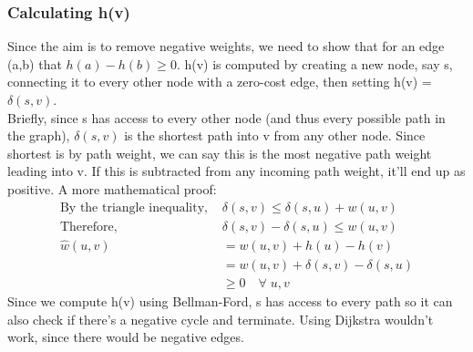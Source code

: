 \subsubsection{Calculating h(v)}
Since the aim is to remove negative weights, we need to show that for an edge (a,b) that \(h(a)-h(b) \geq 0\). h(v) is computed by creating a new node, say s, connecting it to every other node with a zero-cost edge, then setting h(v) = $\delta(s,v)$. \\
Briefly, since s has access to every other node (and thus every possible path in the graph), $\delta(s,v)$ is the shortest path into v from any other node. Since shortest is by path weight, we can say this is the most negative path weight leading into v. If this is subtracted from any incoming path weight, it'll end up as positive. A more mathematical proof:
\begin{align}
    \text{By the triangle inequality, }& \delta(s,v) \leq \delta(s,u) + w(u,v) \nonumber \\
    \text{Therefore, }& \delta(s,v) - \delta(s,u) \leq w(u,v) \nonumber \\
    \hat{w}(u,v) &= w(u,v) + h(u) - h(v) \nonumber \\
                 &= w(u,v) + \delta(s,v) - \delta(s,u) \nonumber \\
                 &\geq 0 \quad \forall \; u,v \nonumber 
\end{align}
Since we compute h(v) using Bellman-Ford, s has access to every path so it can also check if there's a negative cycle and terminate. Using Dijkstra wouldn't work, since there would be negative edges.

